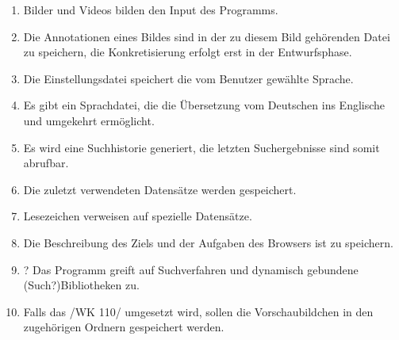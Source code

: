 \begin{enumerate} [label=\bfseries /PD \arabic*0/]
	\item Bilder und Videos bilden den Input des Programms.
	\item Die Annotationen eines Bildes sind in der zu diesem Bild gehörenden Datei zu speichern, die Konkretisierung erfolgt erst 		in der Entwurfsphase.
	\item Die Einstellungsdatei speichert die vom Benutzer gewählte Sprache.
	\item Es gibt ein Sprachdatei, die die Übersetzung vom Deutschen ins Englische und umgekehrt ermöglicht.
	\item Es wird eine Suchhistorie generiert, die letzten Suchergebnisse sind somit abrufbar. 
	\item Die zuletzt verwendeten Datensätze werden gespeichert.
	\item Lesezeichen verweisen auf spezielle Datensätze.
	\item Die Beschreibung des Ziels und der Aufgaben des Browsers ist zu speichern.
	\item ? Das Programm greift auf Suchverfahren und dynamisch gebundene (Such?)Bibliotheken zu.
	\item Falls das /WK 110/ umgesetzt wird, sollen die Vorschaubildchen in den zugehörigen Ordnern gespeichert werden.
\end{enumerate}
